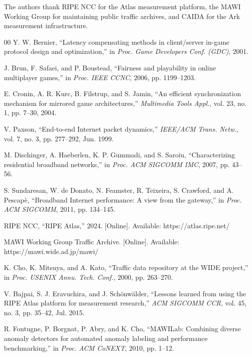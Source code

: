 \documentclass[conference]{IEEEtran}
\begin{document}
The authors thank RIPE NCC for the Atlas measurement platform, the MAWI Working Group for maintaining public traffic archives, and CAIDA for the Ark measurement infrastructure.

\begin{thebibliography}{00}
 Y. W. Bernier, ``Latency compensating methods in client/server in-game protocol design and optimization,'' in \textit{Proc. Game Developers Conf. (GDC)}, 2001.

 J. Brun, F. Safaei, and P. Boustead, ``Fairness and playability in online multiplayer games,'' in \textit{Proc. IEEE CCNC}, 2006, pp. 1199--1203.

 E. Cronin, A. R. Kurc, B. Filstrup, and S. Jamin, ``An efficient synchronization mechanism for mirrored game architectures,'' \textit{Multimedia Tools Appl.}, vol. 23, no. 1, pp. 7--30, 2004.

 V. Paxson, ``End-to-end Internet packet dynamics,'' \textit{IEEE/ACM Trans. Netw.}, vol. 7, no. 3, pp. 277--292, Jun. 1999.

 M. Dischinger, A. Haeberlen, K. P. Gummadi, and S. Saroiu, ``Characterizing residential broadband networks,'' in \textit{Proc. ACM SIGCOMM IMC}, 2007, pp. 43--56.

 S. Sundaresan, W. de Donato, N. Feamster, R. Teixeira, S. Crawford, and A. Pescap\`{e}, ``Broadband Internet performance: A view from the gateway,'' in \textit{Proc. ACM SIGCOMM}, 2011, pp. 134--145.

 RIPE NCC, ``RIPE Atlas,'' 2024. [Online]. Available: https://atlas.ripe.net/

 MAWI Working Group Traffic Archive. [Online]. Available: https://mawi.wide.ad.jp/mawi/

 K. Cho, K. Mitsuya, and A. Kato, ``Traffic data repository at the WIDE project,'' in \textit{Proc. USENIX Annu. Tech. Conf.}, 2000, pp. 263--270.

 V. Bajpai, S. J. Eravuchira, and J. Sch\"{o}nw\"{a}lder, ``Lessons learned from using the RIPE Atlas platform for measurement research,'' \textit{ACM SIGCOMM CCR}, vol. 45, no. 3, pp. 35--42, Jul. 2015.

 R. Fontugne, P. Borgnat, P. Abry, and K. Cho, ``MAWILab: Combining diverse anomaly detectors for automated anomaly labeling and performance benchmarking,'' in \textit{Proc. ACM CoNEXT}, 2010, pp. 1--12.


\end{thebibliography}
\end{document}
